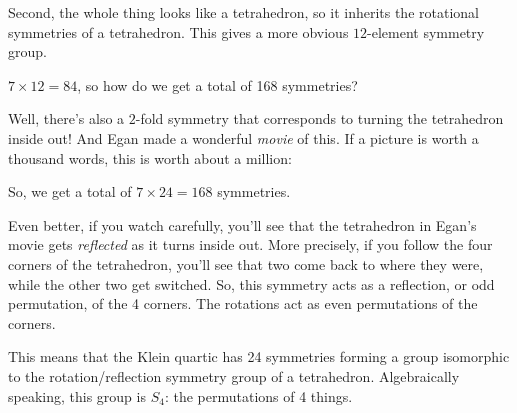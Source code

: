 \documentclass{article}
\def\tightlist{}
\renewcommand{\texttt}[1]{%
  \begingroup
  \ttfamily
  \begingroup\lccode`~=`/\lowercase{\endgroup\def~}{/\discretionary{}{}{}}%
  \begingroup\lccode`~=`[\lowercase{\endgroup\def~}{[\discretionary{}{}{}}%
  \begingroup\lccode`~=`.\lowercase{\endgroup\def~}{.\discretionary{}{}{}}%
  \catcode`/=\active\catcode`[=\active\catcode`.=\active
  \scantokens{#1\noexpand}%
  \endgroup
}
\begin{document}
Second, the whole thing looks like a tetrahedron, so it inherits the
rotational symmetries of a tetrahedron. This gives a more obvious
\(12\)-element symmetry group.

\(7 \times 12 = 84\), so how do we get a total of 168 symmetries?

Well, there's also a \(2\)-fold symmetry that corresponds to turning the
tetrahedron inside out! And Egan made a wonderful \emph{movie} of this.
If a picture is worth a thousand words, this is worth about a million:


So, we get a total of \(7 \times 24 = 168\) symmetries.

Even better, if you watch carefully, you'll see that the tetrahedron in
Egan's movie gets \emph{reflected} as it turns inside out. More
precisely, if you follow the four corners of the tetrahedron, you'll see
that two come back to where they were, while the other two get switched.
So, this symmetry acts as a reflection, or odd permutation, of the 4
corners. The rotations act as even permutations of the corners.

This means that the Klein quartic has 24 symmetries forming a group
isomorphic to the rotation/reflection symmetry group of a tetrahedron.
Algebraically speaking, this group is \(S_4\): the permutations of 4
things.
\end{document}
